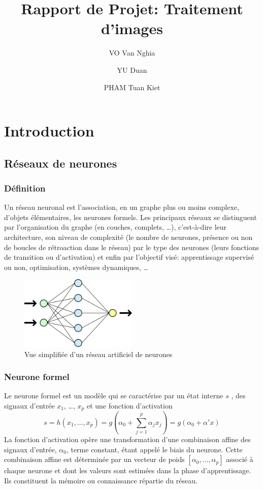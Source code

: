 \documentclass[12pt,a4paper]{article}
\author{VO Van Nghia}
\author{YU Duan}
\author{PHAM Tuan Kiet}
\affil{Etudians 2ème année MIC, Institut national des sciences appliquées de Toulouse}
\title{Rapport de Projet: Traitement d'images}
\begin{document}
\maketitle
\tableofcontents

\pagebreak
\section{Introduction}
\subsection{Réseaux de neurones}
\subsubsection{Définition}
Un réseau neuronal est l’association, en un graphe plus ou moins complexe,
d’objets élémentaires, les neurones formels. Les principaux réseaux se distinguent par l’organisation du graphe
(en couches, complets, \dots), c’est-à-dire leur architecture, son niveau de complexité
(le nombre de neurones, présence ou non de boucles de rétroaction dans le réseau)
par le type des neurones (leurs fonctions de transition ou d’activation) et enfin par l’objectif visé:
apprentissage supervisé ou non, optimisation, systèmes dynamiques, \dots \cite{univ-toulouse}

\begin{figure}[h!]
  \centering
  \includegraphics[width=0.5\textwidth]{Neural_network.png}
  \caption{Vue simplifiée d'un réseau artificiel de neurones}
  \label{fig:1}
\end{figure}

\subsubsection{Neurone formel}
Le neurone formel est un modèle qui se caractérise par
un état interne $s$ , des signaux d’entrée $x_{1}$, \dots,  $x_{p}$ et une fonction d’activation
$$ s=h(x_{1},\dots,x_{p})=g(\alpha_{0} + \sum_{j=1}^{p} \alpha_{j}x_{j}) = g(\alpha_{0} + \alpha' x)$$
La fonction d’activation opère une transformation d’une combinaison affine
des signaux d’entrée, $\alpha_{0}$, terme constant, étant appelé le biais du neurone.
Cette combinaison affine est déterminée par un vecteur de poids
$[\alpha_{0},\dots,\alpha_{p}]$ associé à chaque neurone et dont les valeurs sont estimées dans la phase d’apprentissage.
Ils constituent la mémoire ou connaissance répartie du réseau. \cite{univ-toulouse}
\end{document}
